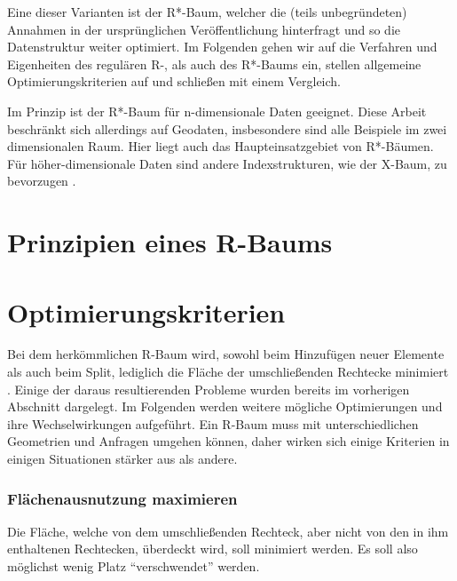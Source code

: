 \documentclass[runningheads,a4paper]{llncs}
\begin{document}
	Eine dieser Varianten ist der R*-Baum, welcher die (teils unbegründeten) Annahmen in der ursprünglichen Veröffentlichung hinterfragt und so die Datenstruktur weiter optimiert. Im Folgenden gehen wir auf die Verfahren und Eigenheiten des regulären R-, als auch des R*-Baums ein, stellen allgemeine Optimierungskriterien auf und schließen mit einem Vergleich.

	Im Prinzip ist der R*-Baum für n-dimensionale Daten geeignet. Diese Arbeit beschränkt sich allerdings auf Geodaten, insbesondere sind alle Beispiele im zwei dimensionalen Raum. Hier liegt auch das Haupteinsatzgebiet von R*-Bäumen. Für höher-dimensionale Daten sind andere Indexstrukturen, wie der X-Baum, zu bevorzugen \citep[vgl.][28-29]{Kriegel:1996}.


\section{Prinzipien eines R-Baums} %
\label{sec:prinzipien_eines_r_baums}



\section{Optimierungskriterien} %
\label{sec:optimierungskriterien}

	Bei dem herkömmlichen R-Baum wird, sowohl beim Hinzufügen neuer Elemente als auch beim Split, lediglich die Fläche der umschließenden Rechtecke minimiert \citep[vgl.][50-51]{Guttman:1984}. Einige der daraus resultierenden Probleme wurden bereits im vorherigen Abschnitt dargelegt.
	Im Folgenden werden weitere mögliche Optimierungen und ihre Wechselwirkungen aufgeführt. Ein R-Baum muss mit unterschiedlichen Geometrien und Anfragen umgehen können, daher wirken sich einige Kriterien in einigen Situationen stärker aus als andere.

	\subsubsection{Flächenausnutzung maximieren} %
	\label{ssub:flaechenausnutzung}

	Die Fläche, welche von dem umschließenden Rechteck, aber nicht von den in ihm enthaltenen Rechtecken, überdeckt wird, soll minimiert werden. Es soll also möglichst wenig Platz \enquote{verschwendet} werden. \citep[vgl.][323]{Beckmann:1990}
\end{document}
